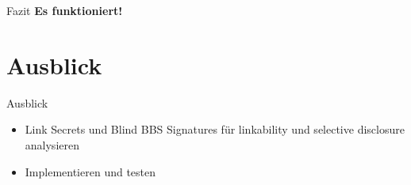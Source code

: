\documentclass[
	german,%
	authorontitle=true,
	]{bfhbeamer}
\begin{document}
\begin{frame}{Fazit}
    \centering
    \textbf{\huge Es funktioniert!}
\end{frame}

\section{Ausblick}

\begin{frame}{Ausblick}
    \begin{itemize}
        \item Link Secrets und Blind BBS Signatures für linkability und selective disclosure analysieren
        \item Implementieren und testen
    \end{itemize}
\end{frame}
\end{document}
